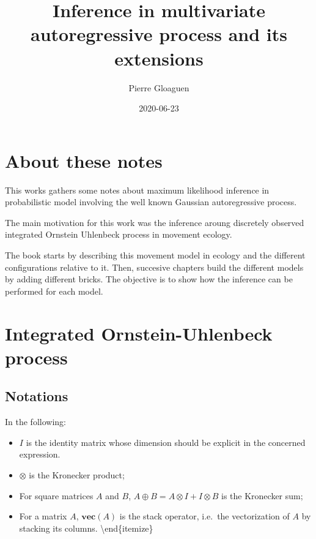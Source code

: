 \documentclass[]{book}
\title{Inference in multivariate autoregressive process and its extensions}
\author{Pierre Gloaguen}
\date{2020-06-23}
\providecommand{\tightlist}{%
  \setlength{\itemsep}{0pt}\setlength{\parskip}{0pt}}
\newcommand{\Vect}[1]{\textbf{vec}\left(#1 \right)}
\begin{document}
\maketitle

{
\setcounter{tocdepth}{1}
\tableofcontents
}
\hypertarget{about-these-notes}{%
\chapter*{About these notes}\label{about-these-notes}}

This works gathers some notes about maximum likelihood inference in probabilistic model involving the well known Gaussian autoregressive process.

The main motivation for this work was the inference aroung discretely observed integrated Ornstein Uhlenbeck process in movement ecology.

The book starts by describing this movement model in ecology and the different configurations relative to it. Then, succesive chapters build the different models by adding different bricks.
The objective is to show how the inference can be performed for each model.

\hypertarget{integrated-ornstein-uhlenbeck-process}{%
\chapter{Integrated Ornstein-Uhlenbeck process}\label{integrated-ornstein-uhlenbeck-process}}

\hypertarget{notations}{%
\section{Notations}\label{notations}}

In the following:

\begin{itemize}
\tightlist
\item
  \(I\) is the identity matrix whose dimension should be explicit in the concerned expression.
\item
  \(\otimes\) is the Kronecker product;
\item
  For square matrices \(A\) and \(B\), \(A \oplus B = A\otimes I + I \otimes B\) is the Kronecker sum;
\item
  For a matrix \(A\), \(\Vect A\) is the stack operator, i.e.~the vectorization of \(A\) by stacking its columns.
  \textbackslash{}end\{itemize\}
\end{itemize}
\end{document}
